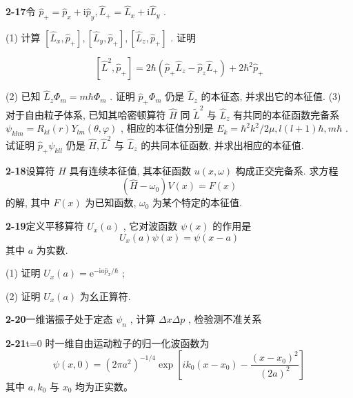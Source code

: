 \vfill

\newpage
\vfill

\noindent
\textbf{2-17}\quad 令 $\hat{p}_{+} = \hat{p}_{x} + \mathrm{i}\hat{p}_{y},\hat{L}_{+} = \hat{L}_{x} + \mathrm{i}\hat{L}_{y}$ . 

(1) 计算 $[\hat{L}_x,\hat{p}_+],[\hat{L}_y,\hat{p}_+],[\hat{L}_z,\hat{p}_+]$ . 证明

$$
[ \hat {L} ^ {2}, \hat {p} _ {+} ] = 2 \hbar (\hat {p} _ {+} \hat {L} _ {z} - \hat {p} _ {z} \hat {L} _ {+}) + 2 \hbar^ {2} \hat {p} _ {+}
$$

(2) 已知 $\hat{L}_z\Phi_m = m\hbar \Phi_m$ . 证明 $\hat{p}_+ \Phi_m$ 仍是 $\hat{L}_z$ 的本征态, 并求出它的本征值. (3) 对于自由粒子体系, 已知其哈密顿算符 $\hat{H}$ 同 $\tilde{L}^2$ 与 $\hat{L}_z$ 有共同的本征函数完备系 $\psi_{klm} = R_{kl}(r)Y_{lm}(\theta, \varphi)$ , 相应的本征值分别是 $E_k = \hbar^2 k^2 / 2\mu, l(l + 1)\hbar, m\hbar$ . 试证明 $\hat{p}_+ \psi_{kll}$ 仍是 $\hat{H}, \hat{L}^2$ 与 $\hat{L}_z$ 的共同本征函数, 并求出相应的本征值.

\vfill

\newpage
\vfill

\noindent
\textbf{2-18}\quad 设算符 $\hat{H}$ 具有连续本征值, 其本征函数 $u(x, \omega)$ 构成正交完备系. 求方程
\begin{equation}
(\hat{H} - \omega_{0}) V(x) = F(x)\tag{1}
\end{equation}
的解, 其中 $F(x)$ 为已知函数, $\omega_0$ 为某个特定的本征值.

\vfill

\newpage
\vfill

\noindent
\textbf{2-19}\quad 定义平移算符 $U_{x}(a)$ , 它对波函数 $\psi(x)$ 的作用是
$$
U _ {x} (a) \psi (x) = \psi (x - a)
$$
其中 $a$ 为实数. 

(1) 证明 $U_x(a) = \mathrm{e}^{-\mathrm{i}a\hat{p}_x / \hbar}$ ; 

(2) 证明 $U_x(a)$ 为幺正算符.

\vfill

\newpage
\vfill

\noindent
\textbf{2-20}\quad 一维谐振子处于定态 $\psi_{n}$ , 计算 $\Delta x\Delta p$ , 检验测不准关系

\vfill

\newpage
\vfill

\noindent
\textbf{2-21}\quad t=0 时一维自由运动粒子的归一化波函数为
\begin{equation}
\psi (x, 0) = \left(2 \pi a ^ {2}\right) ^ {- 1 / 4} \exp \left[ i k _ {0} \left(x - x _ {0}\right) - \frac {\left(x - x _ {0}\right) ^ {2}}{(2 a) ^ {2}} \right]
\end{equation}
其中 $a, k_0$ 与 $x_0$ 均为正实数。

